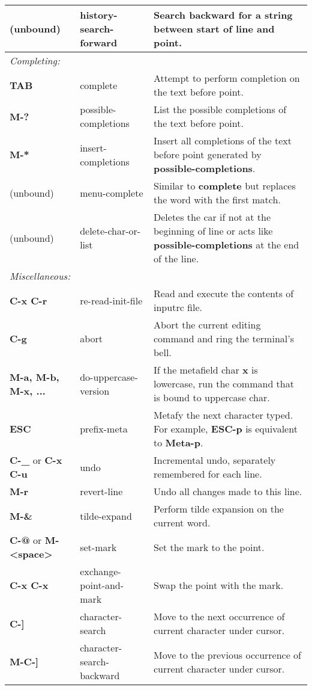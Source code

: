 \documentclass{article}
\begin{document}
\begin{tabular}{|p{3.5cm}|p{4cm}|p{10cm}|}
(unbound) & history-search-forward &  Search backward for a string between start of line and point. \\
\hline
\multicolumn{3}{|l|}{\small\it{Completing:}} \\
\hline
\textbf{TAB} & complete & Attempt to perform completion on the text before point. \\
\hline
\textbf{M-?} & possible-completions & List the possible completions of the text before point. \\
\hline
\textbf{M-*} & insert-completions & Insert all completions of the text before point generated by \textbf{possible-completions}. \\
\hline
(unbound) & menu-complete & Similar to \textbf{complete} but replaces the word with the first match. \\
(unbound) & delete-char-or-list & Deletes the car if not at the beginning of line or acts like \textbf{possible-completions} at the end of the line. \\
\hline
\multicolumn{3}{|l|}{\small\it{Miscellaneous:}} \\
\hline
\textbf{C-x C-r} & re-read-init-file & Read and execute the contents of inputrc file. \\
\hline
\textbf{C-g} & abort & Abort the current editing command and ring the terminal's bell. \\
\hline
\textbf{M-a, M-b, M-x, ...} & do-uppercase-version & If the metafield char \textbf{x} is lowercase, run the command that is bound to uppercase char. \\
\hline
\textbf{ESC} & prefix-meta & Metafy the next character typed. For example, \textbf{ESC-p} is equivalent to \textbf{Meta-p}. \\
\hline
\textbf{C-\_} or \textbf{C-x C-u}& undo & Incremental undo, separately remembered for each line. \\
\hline
\textbf{M-r} & revert-line & Undo all changes made to this line. \\
\hline
\textbf{M-\&} & tilde-expand & Perform tilde expansion on the current word. \\
\hline
\textbf{C-@} or \textbf{M-{\textless}space{\textgreater}}& set-mark & Set the mark to the point. \\
\hline
\textbf{C-x C-x} & exchange-point-and-mark & Swap the point with the mark. \\
\hline
\textbf{C-]} & character-search & Move to the next occurrence of current character under cursor. \\
\hline
\textbf{M-C-]} & character-search-backward & Move to the previous occurrence of current character under cursor. \\

\end{tabular}
\end{document}
